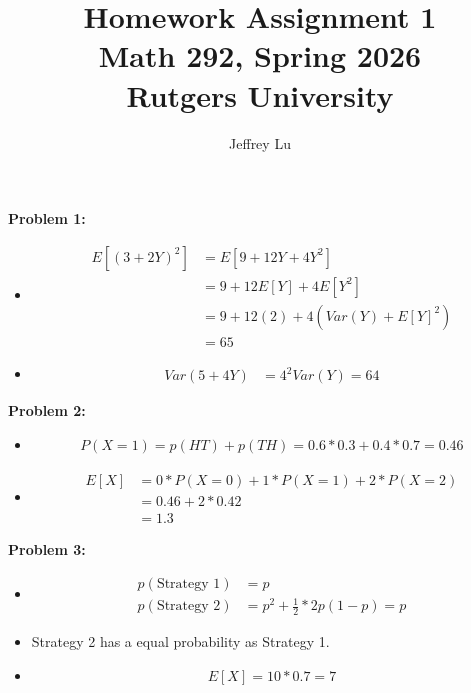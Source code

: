 \documentclass[12pt]{article}
\title{Homework Assignment 1 \\ \large Math 292, Spring 2026 \\ Rutgers University}
\author{Jeffrey Lu}
\begin{document}
\maketitle

\noindent \textbf{Problem 1:}
\begin{itemize}
    \item [(a)]
          \begin{align*}
              E[(3+2Y)^2] & = E[9 + 12Y + 4Y^2]              \\
                          & = 9 + 12E[Y] + 4E[Y^2]           \\
                          & = 9 + 12(2) + 4(Var(Y) + E[Y]^2) \\
                          & = 65
          \end{align*}

    \item [(b)]
          \begin{align*}
              Var(5+4Y) & = 4^2Var(Y) = 64
          \end{align*}
\end{itemize}

\noindent \textbf{Problem 2:}
\begin{itemize}
    \item [(a)]
          \begin{align*}
              P(X=1) = p(HT) + p(TH) = 0.6 * 0.3 + 0.4 * 0.7 = 0.46
          \end{align*}

    \item [(b)]
          \begin{align*}
              E[X] & = 0 * P(X=0) + 1 * P(X=1) + 2 * P(X=2) \\
                   & = 0.46 + 2 * 0.42                      \\
                   & = 1.3
          \end{align*}
\end{itemize}

\noindent \textbf{Problem 3:}

\begin{itemize}
    \item [(a)]
          \begin{align*}
              p(\text{Strategy 1}) & = p                               \\
              p(\text{Strategy 2}) & = p^2 + \frac{1}{2} * 2p(1-p) = p
          \end{align*}

    \item [(b)] Strategy 2 has a equal probability as Strategy 1.
    \item [(c)]
          \begin{align*}
              E[X] = 10 * 0.7 = 7
          \end{align*}
\end{itemize}
\end{document}
